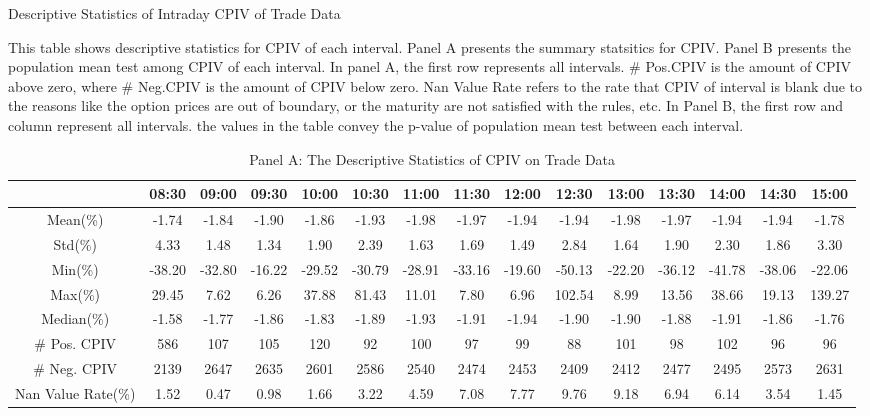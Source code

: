 \begin{table}[h]
\centering
\caption{Descriptive Statistics of Intraday CPIV of Trade Data}\label{table:stats_of_CPIV_2}
\begin{threeparttable}

\medskip

{\scriptsize 
This table shows descriptive statistics for CPIV of each interval. Panel A presents the summary statsitics for CPIV. Panel B presents the population mean test among CPIV of each interval. In panel A, the first row represents all intervals.  \# Pos.CPIV is the amount of CPIV above zero, where \# Neg.CPIV is the amount of CPIV below zero. Nan Value Rate refers to the rate that CPIV of interval is blank due to the reasons like the option prices are out of boundary, or the maturity are not satisfied with the rules, etc. In Panel B, the first row and column represent all intervals. the values in the table convey the p-value of population mean test between each interval. 
}
\medskip

\begin{subtable}[t]{\linewidth}

\caption{Panel A: The Descriptive Statistics of CPIV on Trade Data }
\tiny

\begin{tabular}{ccccccccccccccc}
\toprule

                   & 08:30  & 09:00  & 09:30  & 10:00  & 10:30  & 11:00  & 11:30  & 12:00  & 12:30  & 13:00  & 13:30  & 14:00  & 14:30  & 15:00  \\ \midrule	
Mean(\%)           & -1.74  & -1.84  & -1.90  & -1.86  & -1.93  & -1.98  & -1.97  & -1.94  & -1.94  & -1.98  & -1.97  & -1.94  & -1.94  & -1.78  \\
Std(\%)            & 4.33   & 1.48   & 1.34   & 1.90   & 2.39   & 1.63   & 1.69   & 1.49   & 2.84   & 1.64   & 1.90   & 2.30   & 1.86   & 3.30   \\
Min(\%)            & -38.20 & -32.80 & -16.22 & -29.52 & -30.79 & -28.91 & -33.16 & -19.60 & -50.13 & -22.20 & -36.12 & -41.78 & -38.06 & -22.06 \\
Max(\%)            & 29.45  & 7.62   & 6.26   & 37.88  & 81.43  & 11.01  & 7.80   & 6.96   & 102.54 & 8.99   & 13.56  & 38.66  & 19.13  & 139.27 \\
Median(\%)         & -1.58  & -1.77  & -1.86  & -1.83  & -1.89  & -1.93  & -1.91  & -1.94  & -1.90  & -1.90  & -1.88  & -1.91  & -1.86  & -1.76  \\
\# Pos. CPIV       & 586    & 107    & 105    & 120    & 92     & 100    & 97     & 99     & 88     & 101    & 98     & 102    & 96     & 96     \\
\# Neg. CPIV       & 2139   & 2647   & 2635   & 2601   & 2586   & 2540   & 2474   & 2453   & 2409   & 2412   & 2477   & 2495   & 2573   & 2631   \\
Nan Value Rate(\%) & 1.52   & 0.47   & 0.98   & 1.66   & 3.22   & 4.59   & 7.08   & 7.77   & 9.76   & 9.18   & 6.94   & 6.14   & 3.54   & 1.45 
\\
\bottomrule
\end{tabular}
\end{subtable}



\end{threeparttable}
\end{table}
